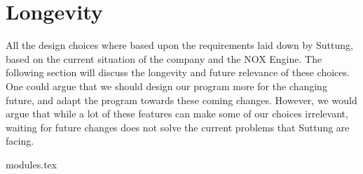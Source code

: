 \section{Longevity}
All the design choices where based upon the requirements laid down by Suttung,
based on the current situation of the company and the NOX Engine.
The following section will discuss the longevity and future relevance of
these choices.
One could argue that we should design our program more for the changing future,
and adapt the program towards these coming changes.
However, we would argue that while a lot of these features can make some of our choices
irrelevant, waiting for future changes does not solve the current problems that
Suttung are facing.

{modules.tex}
